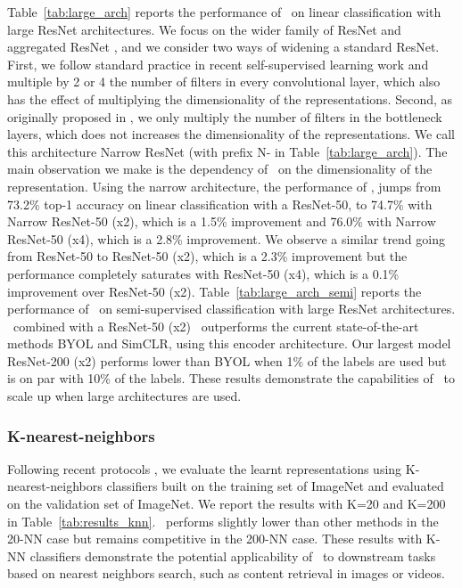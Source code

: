 Table~\ref{tab:large_arch} reports the performance of \algo \ on linear classification with large ResNet architectures. We focus on the wider family of ResNet \cite{zagoruyko2016resnetwide} and aggregated ResNet \cite{xie2017resnext}, and we consider two ways of widening a standard ResNet. First, we follow standard practice in recent self-supervised learning work \cite{caron2020swav, grill2020byol, chen2020simclr} and multiple by 2 or 4 the number of filters in every convolutional layer, which also has the effect of multiplying the dimensionality of the representations. Second, as originally proposed in \cite{zagoruyko2016resnetwide}, we only multiply the number of filters in the bottleneck layers, which does not increases the dimensionality of the representations. We call this architecture Narrow ResNet (with prefix N- in Table~\ref{tab:large_arch}). The main observation we make is the dependency of \algo \ on the dimensionality of the representation. Using the narrow architecture, the performance of \algo, jumps from 73.2\% top-1 accuracy on linear classification with a ResNet-50, to 74.7\% with Narrow ResNet-50 (x2), which is a 1.5\% improvement and 76.0\% with Narrow ResNet-50 (x4), which is a 2.8\% improvement. We observe a similar trend going from ResNet-50 to ResNet-50 (x2), which is a 2.3\% improvement but the performance completely saturates with ResNet-50 (x4), which is a 0.1\% improvement over ResNet-50 (x2). Table~\ref{tab:large_arch_semi} reports the performance of \algo \ on semi-supervised classification with large ResNet architectures. \algo \ combined with a ResNet-50 (x2) \ outperforms the current state-of-the-art methods BYOL and SimCLR, using this encoder architecture. Our largest model ResNet-200 (x2) performs lower than BYOL when 1\% of the labels are used but is on par with 10\% of the labels. These results demonstrate the capabilities of \algo \ to scale up when large architectures are used.

\subsubsection{K-nearest-neighbors}

Following recent protocols \cite{caron2020swav, wu2018discrimination, zhuang2019local}, we evaluate the learnt representations using K-nearest-neighbors classifiers built on the training set of ImageNet and evaluated on the validation set of ImageNet. We report the results with K=20 and K=200 in Table~\ref{tab:results_knn}. \algo \ performs slightly lower than other methods in the 20-NN case but remains competitive in the 200-NN case. These results with K-NN classifiers demonstrate the potential applicability of \algo \ to downstream tasks based on nearest neighbors search, such as content retrieval in images or videos.

